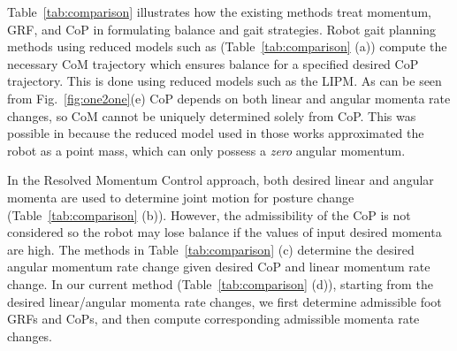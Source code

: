 \documentclass{llncs}
\begin{document}

Table~\ref{tab:comparison} illustrates how the existing methods treat momentum,
GRF, and CoP in formulating balance and gait strategies.
Robot gait planning methods using reduced models such
as \cite{KKKYH01,Choi07} (Table~\ref{tab:comparison} (a))
compute the necessary CoM trajectory which ensures balance
for a specified desired CoP trajectory.
This is done using reduced models such as the LIPM.
As can be seen from Fig.~\ref{fig:one2one}(e) CoP depends  on both
linear and angular momenta rate changes, so
CoM cannot be uniquely determined solely from CoP.
This was possible in \cite{KKKYH01,Choi07} because the reduced model used in those works
approximated the robot as a point mass, which
can only possess a {\it zero} angular momentum.

In the Resolved Momentum Control approach\cite{KKKFHYH03},
both desired linear and angular momenta are used to determine
joint motion for posture change (Table~\ref{tab:comparison} (b)).
However, the admissibility of the CoP is not considered so the
robot may lose balance if the values of input desired momenta are high.
The methods in Table~\ref{tab:comparison} (c) determine
the desired angular momentum rate change given desired CoP and linear momentum rate change.
In our current method (Table~\ref{tab:comparison} (d)), starting
from the desired linear/angular momenta rate changes, we first determine
admissible foot GRFs and CoPs, and then compute corresponding admissible
momenta rate changes.
\end{document}
